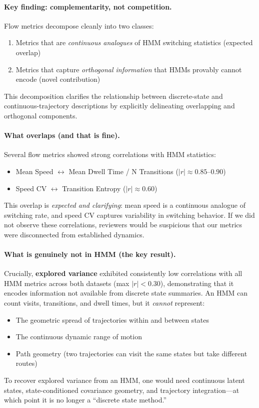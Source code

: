 \documentclass[5p,twocolumn,authoryear]{elsarticle}
\begin{document}
\paragraph{Key finding: complementarity, not competition.}
Flow metrics decompose cleanly into two classes:
\begin{enumerate}
    \item Metrics that are \emph{continuous analogues} of HMM switching statistics (expected overlap)
    \item Metrics that capture \emph{orthogonal information} that HMMs provably cannot encode (novel contribution)
\end{enumerate}
This decomposition clarifies the relationship between discrete-state and continuous-trajectory descriptions by explicitly delineating overlapping and orthogonal components.

\paragraph{What overlaps (and that is fine).}
Several flow metrics showed strong correlations with HMM statistics:
\begin{itemize}
    \item Mean Speed $\leftrightarrow$ Mean Dwell Time / N Transitions ($|r| \approx 0.85$--$0.90$)
    \item Speed CV $\leftrightarrow$ Transition Entropy ($|r| \approx 0.60$)
\end{itemize}
This overlap is \emph{expected and clarifying}: mean speed is a continuous analogue of switching rate, and speed CV captures variability in switching behavior. If we did not observe these correlations, reviewers would be suspicious that our metrics were disconnected from established dynamics.

\paragraph{What is genuinely not in HMM (the key result).}
Crucially, \textbf{explored variance} exhibited consistently low correlations with all HMM metrics across both datasets (max $|r| < 0.30$), demonstrating that it encodes information not available from discrete state summaries. An HMM can count visits, transitions, and dwell times, but it \emph{cannot} represent:
\begin{itemize}
    \item The geometric spread of trajectories within and between states
    \item The continuous dynamic range of motion
    \item Path geometry (two trajectories can visit the same states but take different routes)
\end{itemize}
To recover explored variance from an HMM, one would need continuous latent states, state-conditioned covariance geometry, and trajectory integration---at which point it is no longer a ``discrete state method.''
\end{document}
